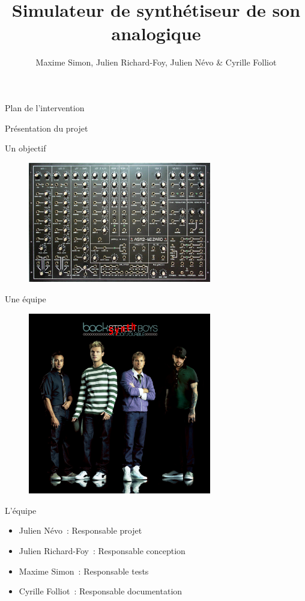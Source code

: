\documentclass[frenchb]{beamer}
\title[M2GL-VET]{Simulateur de synthétiseur de son analogique}
\author{Maxime Simon, Julien Richard-Foy, Julien Névo \& Cyrille Folliot}
\institute[ISTIC]{Université de Rennes 1}
\begin{document}
\begin{frame}
    \titlepage
\end{frame}
	
	
\begin{frame}{Plan de l'intervention}
    \tableofcontents
\end{frame}

\begin{frame}{Présentation du projet}
\end{frame}

\begin{frame}{Un objectif}
    \begin{figure}
        \includegraphics[width=8cm ]{../img/png/synth.jpg}
    \end{figure}
\end{frame}
\begin{frame}{Une équipe}
    \begin{figure}
        \includegraphics[width=8cm ]{../img/png/back.jpg}
    \end{figure}
\end{frame}

\begin{frame}{L'équipe}
\begin{itemize}    \item Julien Névo~: Responsable projet
    \item Julien Richard-Foy~: Responsable conception
    \item Maxime Simon~: Responsable tests
    \item Cyrille Folliot~: Responsable documentation
\end{itemize}
\end{frame}
\end{document}
